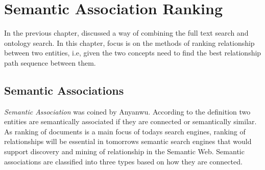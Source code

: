 \chapter{Semantic Association Ranking}

In the previous chapter, discussed a way of combining the full text search and ontology search. In this chapter, focus is on the methods of ranking relationship between two entities, i.e, given the two concepts need to find the best relationship path sequence between them. 

\section{Semantic Associations}
\textit{Semantic Association} was  coined by Anyanwu. According to the definition two entities are semantically associated if they are connected or semantically similar. As ranking of documents is a main focus of todays search engines, ranking of relationships will be essential in tomorrows semantic search engines that would support discovery and mining of relationship in the Semantic Web. Semantic associations are classified into three types based on how they are connected.

